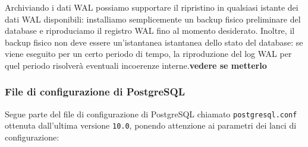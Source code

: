 Archiviando i dati WAL possiamo supportare il ripristino in qualsiasi istante dei dati WAL disponibili: installiamo semplicemente un backup fisico preliminare del database e riproduciamo il registro WAL fino al momento desiderato. Inoltre, il backup fisico non deve essere un'istantanea istantanea dello stato del database: se viene eseguito per un certo periodo di tempo, la riproduzione del log WAL per quel periodo risolver\`{a} eventuali incoerenze interne.\textbf{vedere se metterlo}

\item 
\subsubsection{File di configurazione di PostgreSQL}
Segue parte del file di configurazione di PostgreSQL chiamato \verb"postgresql.conf" ottenuta dall'ultima versione \verb"10.0", ponendo attenzione ai parametri dei lanci di configurazione:
\\ 

